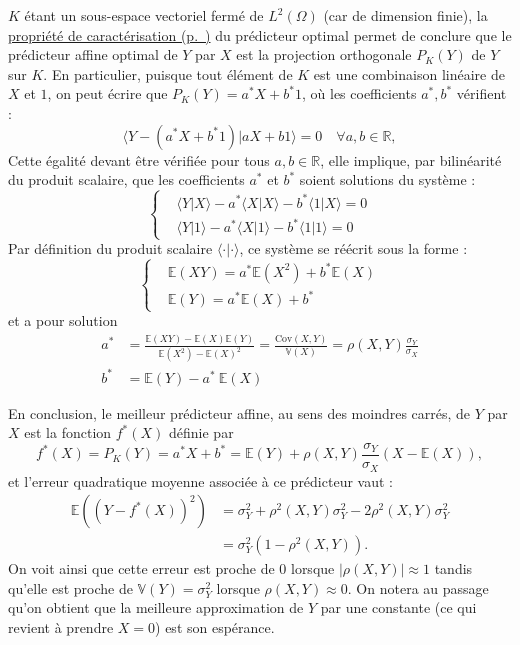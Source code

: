 \(K\) étant un sous-espace vectoriel fermé de \(L^2(\Omega)\) (car de
dimension finie), la \protect\hyperref[III-identEC]{propriété de
caractérisation (p.~\pageref*{III-identEC})} du prédicteur optimal
permet de conclure que le prédicteur affine optimal de \(Y\) par \(X\)
est la projection orthogonale \(P_K(Y)\) de \(Y\) sur \(K\). En
particulier, puisque tout élément de \(K\) est une combinaison linéaire
de \(X\) et \(1\), on peut écrire que \(P_K(Y) = a^*X + b^* 1\), où les
coefficients \(a^*,b^*\) vérifient :
\[ \langle Y - (a^*  X + b^*  1) \vert a  X + b  1 \rangle = 0 \quad  \forall a,b\in\mathbb{R},\]
Cette égalité devant être vérifiée pour tous \(a,b\in\mathbb{R}\), elle
implique, par bilinéarité du produit scalaire, que les coefficients
\(a^*\) et \(b^*\) soient solutions du système : \[
\left\lbrace\begin{aligned}
   &\langle Y \vert X \rangle - a^*\langle X \vert X \rangle-b^*\langle 1 \vert X \rangle  = 0 \\
   &\langle Y \vert 1 \rangle - a^*\langle X \vert 1 \rangle-b^*\langle 1 \vert 1 \rangle = 0
\end{aligned}\right.
\] Par définition du produit scalaire \(\langle\cdot\vert\cdot\rangle\),
ce système se réécrit sous la forme : \[
\left\lbrace\begin{aligned}
   &\mathbb{E}(XY) = a^*\mathbb{E}(X^2)+b^*\mathbb{E}(X)   \\
   &\mathbb{E}(Y) = a^*\mathbb{E}(X)+b^* 
\end{aligned}\right.
\] et a pour solution \[\begin{aligned}
a^* & = \frac{\mathbb{E}(XY)-\mathbb{E}(X)\mathbb{E}(Y)}{\mathbb{E}(X^2)-\mathbb{E}(X)^2}=\frac{\text{Cov}(X,Y)}{\mathbb{V}(X)} = \rho(X,Y)\frac{\sigma_Y}{\sigma_X} \\
b^* & = \mathbb{E}(Y)  - a^*~\mathbb{E}(X)
\end{aligned}\]

En conclusion, le meilleur prédicteur affine, au sens des moindres
carrés, de \(Y\) par \(X\) est la fonction \(f^*(X)\) définie par
\[ f^*(X)=P_K(Y)=a^* X + b^*=\mathbb{E}(Y) + \rho(X,Y)\frac{\sigma_Y}{\sigma_X} (X -\mathbb{E}(X)),\]
et l'erreur quadratique moyenne associée à ce prédicteur vaut :
\[\begin{aligned}
\mathbb{E}\left(\left(Y - f^*(X)\right)^2\right) & = \sigma_Y^2 + \rho^2(X,Y)\sigma^2_Y - 2\rho^2(X,Y)\sigma^2_Y\\
                        & = \sigma^2_Y(1-\rho^2(X,Y)).
\end{aligned}\] On voit ainsi que cette erreur est proche de 0 lorsque
\(|\rho(X,Y)| \approx 1\) tandis qu'elle est proche de
\(\mathbb{V}(Y) = \sigma^2_Y\) lorsque \(\rho(X,Y) \approx 0\). On
notera au passage qu'on obtient que la meilleure approximation de \(Y\)
par une constante (ce qui revient à prendre \(X=0\)) est son espérance.

